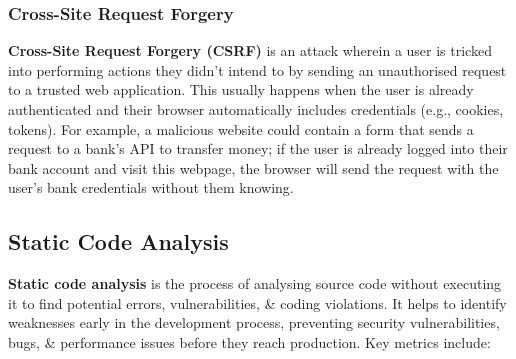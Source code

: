 \documentclass[a4paper,11pt]{article}
\begin{document}
\subsubsection{Cross-Site Request Forgery}
\textbf{Cross-Site Request Forgery (CSRF)} is an attack wherein a user is tricked into performing actions they didn't intend to by sending an unauthorised request to a trusted web application.
This usually happens when the user is already authenticated and their browser automatically includes credentials (e.g., cookies, tokens).
For example, a malicious website could contain a form that sends a request to a bank's API to transfer money; if the user is already logged into their bank account and visit this webpage, the browser will send the request with the user's bank credentials without them knowing.

\subsection{Static Code Analysis}
\textbf{Static code analysis} is the process of analysing source code without executing it to find potential errors, vulnerabilities, \& coding violations.
It helps to identify weaknesses early in the development process, preventing security vulnerabilities, bugs, \& performance issues before they reach production.
Key metrics include:
\end{document}
